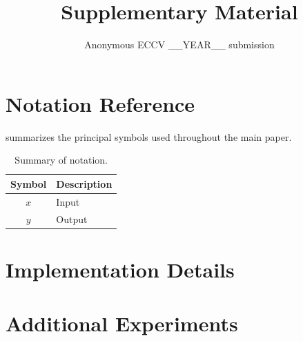 \documentclass[runningheads]{llncs}
\begin{document}
\title{Supplementary Material}
\author{Anonymous ECCV __YEAR__ submission}
\institute{}
\maketitle

\setcounter{page}{1}

\section{Notation Reference}
\label{sec:supp_notation}

 summarizes the principal symbols used throughout the main paper.

\begin{table}[t]
\centering
\caption{Summary of notation.}
\label{tab:notation}
\renewcommand{\arraystretch}{1.15}
\begin{tabular}{@{}cl@{}}
\toprule
\textbf{Symbol} & \textbf{Description} \\
\midrule
$x$             & Input \\
$y$             & Output \\
\bottomrule
\end{tabular}
\end{table}

\section{Implementation Details}
\label{sec:supp_impl}


\section{Additional Experiments}
\label{sec:supp_experiments}

\end{document}
